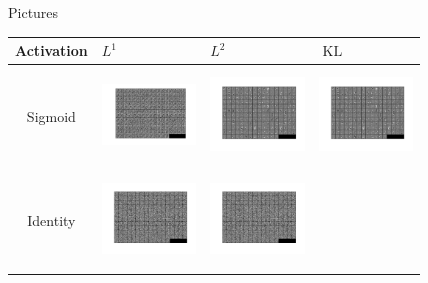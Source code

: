 \documentclass{beamer}
\DeclareMathOperator{\KL}{KL}
\begin{document}
\footnotesize
\begin{frame}{Pictures}
\begin{table}[h!]
\centering
\begin{tabular}{ | c | m{2.5cm} | m{2.5cm} | m{2.5cm}| }
\hline
Activation & $L^1$ & $L^2$ & $\KL$ \\ \hline
Sigmoid
&
\begin{minipage}{.3\textwidth}
\includegraphics[width=25mm, height=25mm]{fig1}
\end{minipage}
& 
\begin{minipage}{.3\textwidth}
\includegraphics[width=25mm, height=25mm]{fig2}
\end{minipage}
& 
\begin{minipage}{.3\textwidth}
\includegraphics[width=25mm, height=25mm]{fig2}
\end{minipage}
\\ \hline
Identity
&
\begin{minipage}{.3\textwidth}
\includegraphics[width=25mm, height=25mm]{fig5}
\end{minipage}
& 
\begin{minipage}{.3\textwidth}
\includegraphics[width=25mm, height=25mm]{fig5}

\end{minipage}
\end{tabular}
\end{table}
\end{frame}
\end{document}
